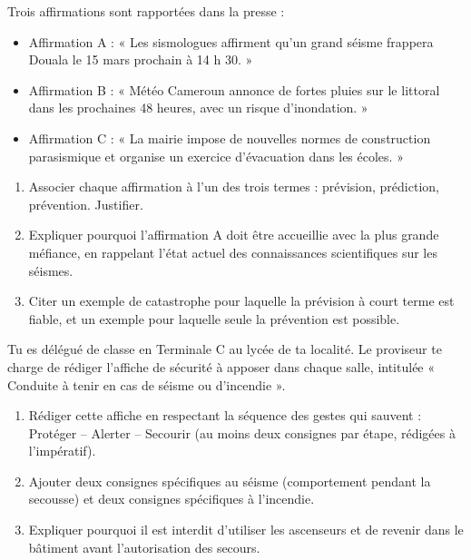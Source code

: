 \documentclass[11pt]{article}
\newcommand{\cle}[1]{{\popxbold\color{popdark}#1}}
\begin{document}
\begin{exercice}
Trois affirmations sont rapportées dans la presse :
\begin{itemize}
\item Affirmation A : « Les sismologues affirment qu'un grand séisme frappera Douala le 15 mars prochain à 14 h 30. »
\item Affirmation B : « Météo Cameroun annonce de fortes pluies sur le littoral dans les prochaines 48 heures, avec un risque d'inondation. »
\item Affirmation C : « La mairie impose de nouvelles normes de construction parasismique et organise un exercice d'évacuation dans les écoles. »
\end{itemize}
\begin{enumerate}
\item Associer chaque affirmation à l'un des trois termes : prévision, prédiction, prévention. Justifier.
\item Expliquer pourquoi l'affirmation A doit être accueillie avec la plus grande méfiance, en rappelant l'état actuel des connaissances scientifiques sur les séismes.
\item Citer un exemple de catastrophe pour laquelle la prévision à court terme est fiable, et un exemple pour laquelle seule la prévention est possible.
\end{enumerate}
\end{exercice}

\begin{exercice}
Tu es délégué de classe en Terminale C au lycée de ta localité. Le proviseur te charge de rédiger l'affiche de sécurité à apposer dans chaque salle, intitulée « Conduite à tenir en cas de séisme ou d'incendie ».
\begin{enumerate}
\item Rédiger cette affiche en respectant la séquence des \cle{gestes qui sauvent} : Protéger -- Alerter -- Secourir (au moins deux consignes par étape, rédigées à l'impératif).
\item Ajouter deux consignes spécifiques au séisme (comportement pendant la secousse) et deux consignes spécifiques à l'incendie.
\item Expliquer pourquoi il est interdit d'utiliser les ascenseurs et de revenir dans le bâtiment avant l'autorisation des secours.
\end{enumerate}
\end{exercice}
\end{document}
